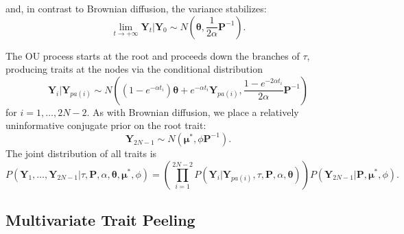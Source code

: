 \documentclass[12pt]{article}
\begin{document}
and, in contrast to Brownian diffusion, the variance stabilizes:
\begin{equation*}
\lim_{t \to +\infty} \textbf{Y}_t | \textbf{Y}_0 \sim N \left(\boldsymbol \theta , \frac{1}{2 \alpha} \textbf{P}^{-1} \right) .
\end{equation*}
\par
The OU process starts at the root and proceeds down the branches of $\tau$, producing traits at the nodes via the conditional
distribution
\begin{equation}
\textbf{Y}_i | \textbf{Y}_{pa(i)} \sim N \left(( 1 - e^{- \alpha t_i} ) \boldsymbol \theta + e^{- \alpha t_i} \textbf{Y}_{pa(i)}, \frac{1-e^{-2 \alpha t_i}}{2 \alpha} \textbf{P}^{-1} \right) 
\end{equation}
for $i = 1, \dots, 2N-2$.  As with Brownian diffusion, we place a relatively uninformative conjugate prior on the root trait: 
\begin{equation}
\textbf{Y}_{2N-1} \sim N \left(\boldsymbol \mu^*, \phi \textbf{P}^{-1} \right).
\end{equation}
The joint distribution of all traits is 
\begin{equation}
P(\textbf{Y}_1,\dots,\textbf{Y}_{2N-1} | \tau, \textbf{P}, \alpha, \boldsymbol \theta, \boldsymbol \mu^*, \phi) = \left( \prod_{i=1}^{2N-2} P(\textbf{Y}_i|\textbf{Y}_{pa(i)},\tau, \textbf{P},\alpha, \boldsymbol \theta) \right) P(\textbf{Y}_{2N-1} | \textbf{P},\boldsymbol \mu^*, \phi) .
\end{equation}


\subsection{Multivariate Trait Peeling}
\end{document}
